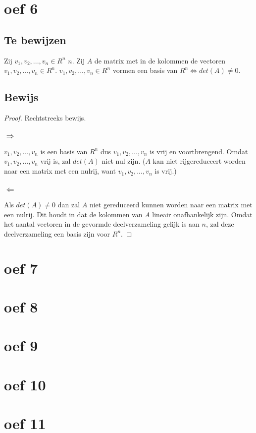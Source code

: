 \documentclass[lineaire_algebra_oplossingen.tex]{subfiles}
\begin{document}
\section{oef 6}
\subsection*{Te bewijzen}
Zij $v_1,v_2,...,v_n \in R^n$ $n$. Zij $A$ de matrix met in de kolommen de vectoren $v_1,v_2,...,v_n \in R^n$.
$v_1,v_2,...,v_n \in R^n$ vormen een basis van $R^n \Leftrightarrow det(A) \neq 0$.
\subsection*{Bewijs}
\begin{proof}
Rechtstreeks bewijs.
\subsubsection*{$\Rightarrow$}
$v_1,v_2,...,v_n$ is een basis van $R^n$ dus $v_1,v_2,...,v_n$ is vrij en voortbrengend. Omdat $v_1,v_2,...,v_n$ vrij is, zal $det(A)$ niet nul zijn. ($A$ kan niet rijgereduceert worden naar een matrix met een nulrij, want $v_1,v_2,...,v_n$ is vrij.)
\subsubsection*{$\Leftarrow$}
Als $det(A) \neq 0$ dan zal $A$ niet gereduceerd kunnen worden naar een matrix met een nulrij. Dit houdt in dat de kolommen van $A$ lineair onafhankelijk zijn. Omdat het aantal vectoren in de gevormde deelverzameling gelijk is aan $n$, zal deze deelverzameling een basis zijn voor $R^n$.
\end{proof}
\section{oef 7}
\section{oef 8}
\section{oef 9}
\section{oef 10}
\section{oef 11}
\end{document}
